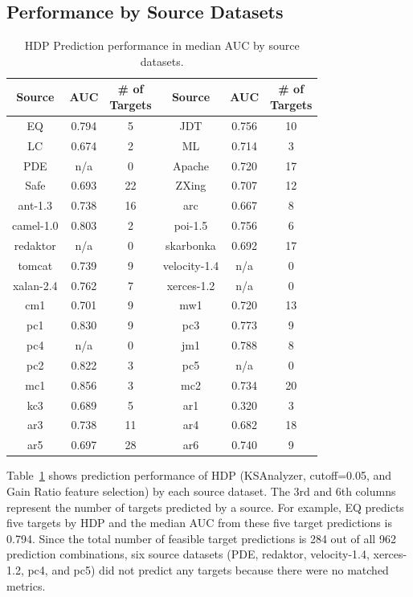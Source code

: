 \subsection{Performance by Source Datasets}
\label{subsec04-0}

\begin{table}[!t]
\caption{HDP Prediction performance in median AUC by source datasets.}
\label{tab:by_source}
\begin{tabular}{|c||c|c||c||c|c|}
\hline
\bf{Source}	& \bf{AUC} 	&\specialcell{\bf{\# of}\\\bf{Targets}} &\bf{ Source} & \bf{AUC} 	&\specialcell{\bf{\# of}\\\bf{Targets}} \\ \hline
\hline
EQ	&0.794	&5	&JDT	&0.756	&10	\\ \hline
LC	&0.674	&2	&ML	&0.714	&3	\\ \hline
PDE	&n/a	&0	&Apache	&0.720	&17	\\ \hline
Safe	&0.693	&22	&ZXing	&0.707	&12	\\ \hline
ant-1.3	&0.738	&16	&arc	&0.667	&8	\\ \hline
camel-1.0	&0.803	&2	&poi-1.5	&0.756	&6	\\ \hline
redaktor	&n/a	&0	&skarbonka	&0.692	&17	\\ \hline
tomcat	&0.739	&9	&velocity-1.4	&n/a	&0	\\ \hline
xalan-2.4	&0.762	&7	&xerces-1.2	&n/a	&0	\\ \hline
cm1	&0.701	&9	&mw1	&0.720	&13	\\ \hline
pc1	&0.830	&9	&pc3	&0.773	&9	\\ \hline
pc4	&n/a	&0	&jm1	&0.788	&8	\\ \hline
pc2	&0.822	&3	&pc5	&n/a	&0	\\ \hline
mc1	&0.856	&3	&mc2	&0.734	&20	\\ \hline
kc3	&0.689	&5	&ar1	&0.320	&3	\\ \hline
ar3	&0.738	&11	&ar4	&0.682	&18	\\ \hline
ar5	&0.697	&28	&ar6	&0.740	&9	\\ \hline
\end{tabular}
\end{table}

Table~\ref{tab:by_source} shows prediction performance of HDP (KSAnalyzer, cutoff=0.05, and Gain Ratio feature selection) by each source dataset. The 3rd and 6th columns represent the number of targets predicted by a source. For example, EQ predicts five targets by HDP and the median AUC from these five target predictions is 0.794. Since the total number of feasible target predictions is 284 out of all 962 prediction combinations, six source datasets (PDE, redaktor, velocity-1.4, xerces-1.2, pc4, and pc5) did not predict any targets because there were no matched metrics.

